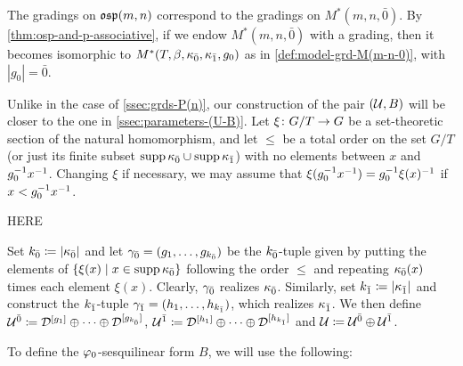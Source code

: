 The gradings on $\mathfrak{osp}(m,n)$ correspond to the gradings on $M^*(m, n, \bar 0)$. 
By \cref{thm:osp-and-p-associative}, if we endow $M^*(m, n, \bar 0)$ with a grading, then it becomes isomorphic to $M^*(T, \beta, \kappa_{\bar{0}}, \kappa_{\bar{1}}, g_0)$ as in \cref{def:model-grd-M(m-n-0)}, with $|g_0| = \bar 0$. 

Unlike in the case of \cref{ssec:grds-P(n)}, our construction of the pair $(\mathcal U, B)$ will be closer to the one in \cref{ssec:parameters-(U-B)}. 
Let $\xi\colon G/T \to G$ be a set-theoretic section of the natural homomorphism, and let $\leq$ be a total order on the set $G/T$ (or just its finite subset $\operatorname{supp} \kappa_{\bar{0}} \cup \operatorname{supp} \kappa_{\bar{1}}$) with no elements between $x$ and $g_0^{-1} x^{-1}$. 
Changing $\xi$ if necessary, we may assume that $\xi(g_0^{-1} x^{-1}) = g_0^{-1} \xi(x)^{-1}$ if $x < g_0^{-1} x^{-1}$. 

HERE

Set $k_{\bar{0}} \coloneqq |\kappa_{\bar{0}}|$ and let $\gamma_{\bar{0}} = (g_1, \ldots, g_{k_{\bar{0}}})$ be the $k_{\bar{0}}$-tuple given by putting the elements of $\{ \xi(x) \mid x \in \operatorname{supp} \kappa_{\bar{0}}\}$ following the order $\leq$ and repeating $\kappa_{\bar{0}}(x)$ times each element $\xi(x)$. 
Clearly, $\gamma_{\bar{0}}$ realizes $\kappa_{\bar{0}}$. 
Similarly, set $k_{\bar{1}} \coloneqq |\kappa_{\bar{1}}|$ and construct the $k_{\bar{1}}$-tuple $\gamma_{\bar{1}} = (h_1, \ldots, h_{k_{\bar{1}}})$, which realizes $\kappa_{\bar{1}}$. 
We then define $\mathcal U^{\bar0} \coloneqq \mathcal{D}^{[g_1]} \oplus \cdots \oplus \mathcal{D}^{[g_{k_{\bar{0}}}]}$, $\mathcal U^{\bar1} \coloneqq \mathcal{D}^{[h_1]} \oplus \cdots \oplus \mathcal{D}^{[h_{k_{\bar{1}}}]}$ and $\mathcal U \coloneqq \mathcal U^{\bar0} \oplus \mathcal U^{\bar1}$. 

To define the $\varphi_0$-sesquilinear form $B$, we will use the following:

